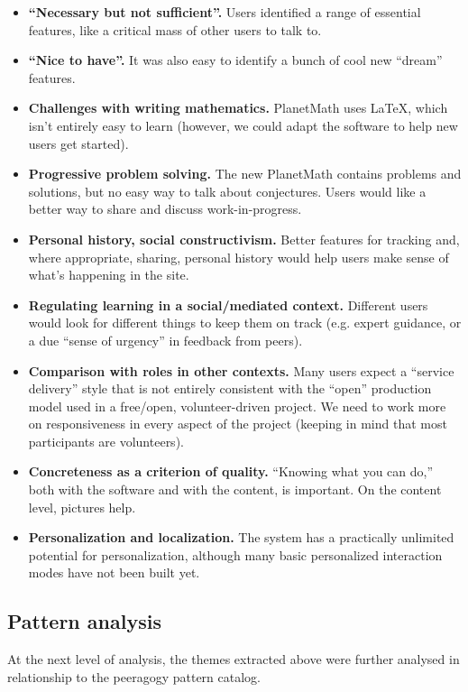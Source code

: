 \begin{itemize}
\item
  \textbf{``Necessary but not sufficient''.} Users identified a range of
  essential features, like a critical mass of other users to talk to.
\item
  \textbf{``Nice to have''.} It was also easy to identify a bunch of
  cool new ``dream'' features.
\item
  \textbf{Challenges with writing mathematics.} PlanetMath uses \LaTeX,
  which isn't entirely easy to learn (however, we could adapt the
  software to help new users get started).
\item
  \textbf{Progressive problem solving.} The new PlanetMath contains
  problems and solutions, but no easy way to talk about conjectures.
  Users would like a better way to share and discuss work-in-progress.
\item
  \textbf{Personal history, social constructivism.} Better features for
  tracking and, where appropriate, sharing, personal history would help
  users make sense of what's happening in the site.
\item
  \textbf{Regulating learning in a social/mediated context.} Different
  users would look for different things to keep them on track (e.g.
  expert guidance, or a due ``sense of urgency'' in feedback from
  peers).
\item
  \textbf{Comparison with roles in other contexts.} Many users expect a
  ``service delivery'' style that is not entirely consistent with the
  ``open'' production model used in a free/open, volunteer-driven
  project. We need to work more on responsiveness in every aspect of the
  project (keeping in mind that most participants are volunteers).
\item
  \textbf{Concreteness as a criterion of quality.} ``Knowing what you
  can do,'' both with the software and with the content, is important.
  On the content level, pictures help.
\item
  \textbf{Personalization and localization.} The system has a
  practically unlimited potential for personalization, although many
  basic personalized interaction modes have not been built yet.
\end{itemize}
\subsection{Pattern analysis}

At the next level of analysis, the themes extracted above were further
analysed in relationship to the peeragogy pattern catalog.

